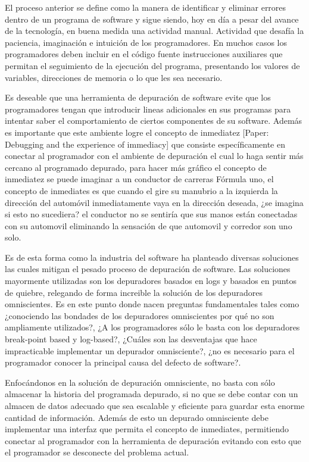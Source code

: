 \documentclass[12pt,a4paper]{report}
\begin{document}
El proceso anterior se define como la manera de identificar y eliminar errores dentro de un programa de software y sigue siendo, hoy en día a pesar del avance de la tecnología, en buena medida una actividad manual.  Actividad que desafía la paciencia, imaginación e intuición de los programadores.  En muchos casos los programadores deben incluir en el código fuente instrucciones auxiliares que permitan el seguimiento de la ejecución del programa, presentando los valores de variables, direcciones de memoria o lo que les sea necesario.

Es deseable que una herramienta de depuración de software evite que los programadores tengan que introducir lineas adicionales en sus programas para intentar saber el comportamiento de ciertos componentes de su software.  Además es importante que este ambiente logre el concepto de inmediatez [Paper: Debugging and the experience of immediacy] que consiste específicamente en conectar al programador con el ambiente de depuración el cual lo haga sentir más cercano al programado depurado, para hacer más gráfico el concepto de inmediatez se puede imaginar a un conductor de carreras Fórmula uno, el concepto de inmediates es que cuando el gire su manubrio a la izquierda la dirección del automóvil inmediatamente vaya en la dirección deseada, ¿se imagina si esto no sucediera? el conductor no se sentiría que sus manos están conectadas con su automovil eliminando la sensación de que automovil y corredor son uno solo.

Es de esta forma como la industria del software ha planteado diversas soluciones las cuales mitigan el pesado proceso de depuración de software.  Las soluciones mayormente utilizadas son los depuradores basados en logs y basados en puntos de quiebre, relegando de forma increible la solución de los depuradores omniscientes.  Es en este punto donde nacen preguntas fundamentales tales como ¿conociendo las bondades de los depuradores omniscientes por qué no son ampliamente utilizados?, ¿A los programadores sólo le basta con los depuradores break-point based y log-based?, ¿Cuáles son las desventajas que hace impracticable implementar un depurador omnisciente?, ¿no es necesario para el programador conocer la principal causa del defecto de software?.

Enfocándonos en la solución de depuración omnisciente, no basta con sólo almacenar la historia del programada depurado, si no que se debe contar con un almacen de datos adecuado que sea escalable y eficiente para guardar esta enorme cantidad de información.  Además de esto un depurado omnisciente debe implementar una interfaz que permita el concepto de inmediates, permitiendo conectar al programador con la herramienta de depuración evitando con esto que el programador se desconecte del problema actual.
\end{document}
